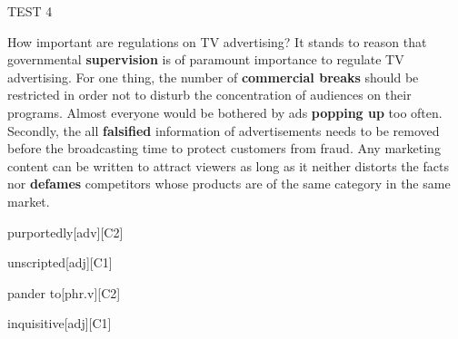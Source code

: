\begin{glossarymc}[Cambridge 11]
\begin{test}{TEST 4}
    \begin{qa}{How important are regulations on TV advertising?}
    It stands to reason that governmental \textbf{supervision} is of paramount importance to regulate TV advertising. For one thing, the number of \textbf{commercial breaks} should be restricted in order not to disturb the concentration of audiences on their programs. Almost everyone would be bothered by ads \textbf{popping up} too often. Secondly, the all \textbf{falsified} information of advertisements needs to be removed before the broadcasting time to protect customers from fraud. Any marketing content can be written to attract viewers as long as it neither distorts the facts nor \textbf{defames} competitors whose products are of the same category in the same market.
    \end{qa}

        \begin{VocabExplain}[Part 3]
            \begin{ExplainCard}{purportedly}[adv][C2]
            \end{ExplainCard}

            \begin{ExplainCard}{unscripted}[adj][C1]
            \end{ExplainCard}

            \begin{ExplainCard}{pander to}[phr.v][C2]
            \end{ExplainCard}

            \begin{ExplainCard}{inquisitive}[adj][C1]
            \end{ExplainCard}


\end{VocabExplain}
\end{test}
\end{glossarymc}
